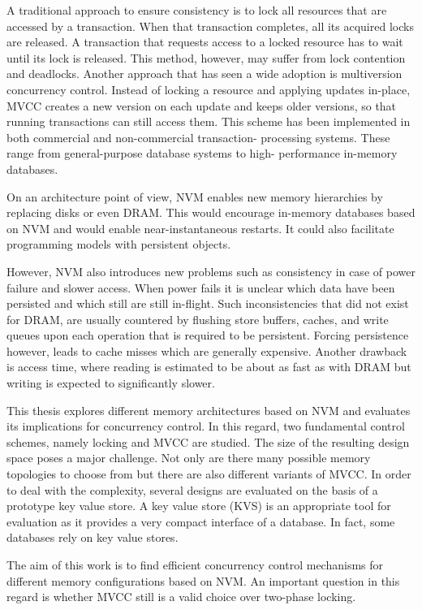 A traditional approach to ensure consistency is to lock all resources that are 
accessed by a transaction. When that transaction completes, all its acquired 
locks are released. A transaction that requests access to a locked resource 
has to wait until its lock is released. This method, however, may suffer from 
lock contention and deadlocks. Another approach that has seen a wide adoption 
is multiversion concurrency control. Instead of locking a resource and 
applying updates in-place, MVCC creates a new version on each update and keeps 
older versions, so that running transactions can still access them. This 
scheme has been implemented in both commercial and non-commercial transaction-
processing systems. These range from general-purpose database systems to high-
performance in-memory databases.


On an architecture point of view, NVM enables new memory hierarchies by replacing disks or even DRAM. This would encourage in-memory databases based on NVM and would enable near-instantaneous restarts. It could also facilitate programming models with persistent objects.

However, NVM also introduces new problems such as consistency in case of power failure and slower access. When power fails it is unclear which data have been persisted and which still are still in-flight. Such inconsistencies that did not exist for DRAM, are usually countered by flushing store buffers, caches, and write queues upon each operation that is required to be persistent. Forcing persistence however, leads to cache misses which are generally expensive. Another drawback is access time, where reading is estimated to be about as fast as with DRAM but writing is expected to significantly slower.

This thesis explores different memory architectures based on NVM and evaluates its implications for concurrency control. In this regard, two fundamental control schemes, namely locking and MVCC are studied. The size of the resulting design space poses a major challenge. Not only are there many possible memory topologies to choose from but there are also different variants of MVCC. In order to deal with the complexity, several designs are evaluated on the basis of a prototype key value store. A key value store (KVS) is an appropriate tool for evaluation as it provides a very compact interface of a database. In fact, some databases rely on key value stores.

The aim of this work is to find efficient concurrency control mechanisms for different memory configurations based on NVM. An important question in this regard is whether MVCC still is a valid choice over two-phase locking.

